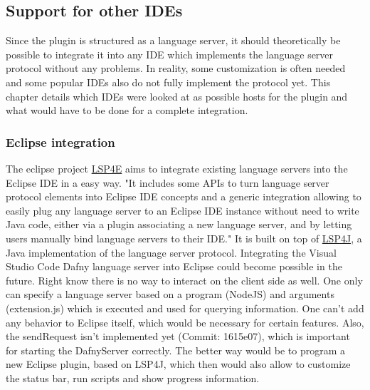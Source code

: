 \subsection{Support for other IDEs} \label{ides}
Since the plugin is structured as a language server, it should theoretically be possible to integrate it into any IDE which implements the language server protocol without any problems. In reality, some customization is often needed and some popular IDEs also do not fully implement the protocol yet. This chapter details which IDEs were looked at as possible hosts for the plugin and what would have to be done for a complete integration.
\subsubsection{Eclipse integration}
The eclipse project \href{https://projects.eclipse.org/projects/technology.lsp4e}{LSP4E} aims to integrate existing language servers into the Eclipse IDE in a easy way. 
\newline
"It includes some APIs to turn language server protocol elements into Eclipse IDE concepts and a generic integration allowing to easily plug any language server to an Eclipse IDE instance without need to write Java code, either via a plugin associating a new language server, and by letting users manually bind language servers to their IDE." \cite{lsp4e}
It is built on top of \href{https://github.com/eclipse/lsp4j}{LSP4J}, a Java implementation of the language server protocol. 
\newline
Integrating the Visual Studio Code Dafny language server into Eclipse could become possible in the future. Right know there is no way to interact on the client side as well. One only can specify a language server based on a program (NodeJS) and arguments (extension.js) which is executed and used for querying information. One can't add any behavior to Eclipse itself, which would be necessary for certain features. Also, the sendRequest isn't implemented yet (Commit: 1615e07), which is important for starting the DafnyServer correctly. 
The better way would be to program a new Eclipse plugin, based on LSP4J, which then would also allow to customize the status bar, run scripts and show progress information. 
